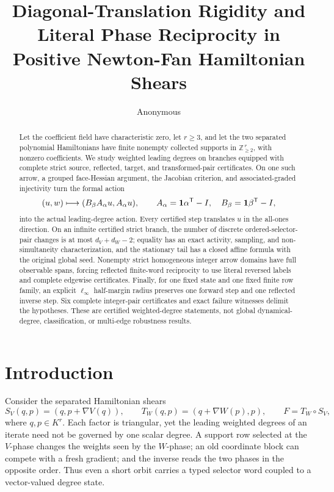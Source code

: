 \documentclass[11pt]{article}
\title{Diagonal-Translation Rigidity and Literal Phase Reciprocity in Positive Newton-Fan Hamiltonian Shears}
\author{Anonymous}
\date{}
\theoremstyle{definition}
\theoremstyle{remark}
\begin{document}
\maketitle

\begin{abstract}
Let the coefficient field have characteristic zero, let \(r\geq3\), and let
the two separated polynomial Hamiltonians have finite nonempty collected
supports in \(\mathbb Z_{\geq2}^{\,r}\), with nonzero coefficients.  We
study weighted leading degrees on branches equipped with complete strict
source, reflected, target, and transformed-pair certificates.  On one such
arrow, a grouped face-Hessian argument, the Jacobian criterion, and
associated-graded injectivity turn the formal action
\[
 (u,w)\longmapsto(B_\beta A_\alpha u,A_\alpha u),
 \qquad A_\alpha=\mathbf{1}\alpha^{\mathsf{T}}-I,\quad
 B_\beta=\mathbf{1}\beta^{\mathsf{T}}-I,
\]
into the actual leading-degree action.  Every certified step translates
\(u\) in the all-ones direction.  On an infinite certified strict branch,
the number of discrete ordered-selector-pair changes is at most
\(d_V+d_W-2\); equality has an exact activity, sampling, and
non-simultaneity characterization, and the stationary tail has a closed
affine formula with the original global seed.  Nonempty strict homogeneous
integer arrow domains have full observable spans, forcing reflected
finite-word reciprocity to use literal reversed labels and complete
edgewise certificates.  Finally, for one fixed state and one fixed finite
row family, an explicit \(\ell_\infty\) half-margin radius preserves one
forward step and one reflected inverse step.  Six complete integer-pair
certificates and exact failure witnesses delimit the hypotheses.  These
are certified weighted-degree statements, not global dynamical-degree,
classification, or multi-edge robustness results.
\end{abstract}

\section{Introduction}

Consider the separated Hamiltonian shears
\[
 S_V(q,p)=(q,p+\nabla V(q)),\qquad
 T_W(q,p)=(q+\nabla W(p),p),\qquad F=T_W\circ S_V ,
\]
where \(q,p\in K^r\).  Each factor is triangular, yet the leading weighted
degrees of an iterate need not be governed by one scalar degree.  A support
row selected at the \(V\)-phase changes the weights seen by the
\(W\)-phase; an old coordinate block can compete with a fresh gradient;
and the inverse reads the two phases in the opposite order.  Thus even a
short orbit carries a typed selector word coupled to a vector-valued degree
state.
\end{document}
